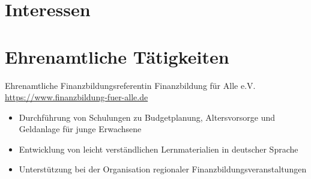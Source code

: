 \documentclass[a4paper, serif, 10pt]{moderncv}
\begin{document}
\section{Interessen}

\section{Ehrenamtliche Tätigkeiten}

        {Ehrenamtliche Finanzbildungsreferentin}
        {Finanzbildung für Alle e.V.}
        {\url{https://www.finanzbildung-fuer-alle.de}}
        {}
        {\begin{itemize}
\item Durchführung von Schulungen zu Budgetplanung, Altersvorsorge und Geldanlage für junge Erwachsene
\item Entwicklung von leicht verständlichen Lernmaterialien in deutscher Sprache
\item Unterstützung bei der Organisation regionaler Finanzbildungsveranstaltungen
\end{itemize}}
    
\end{document}
